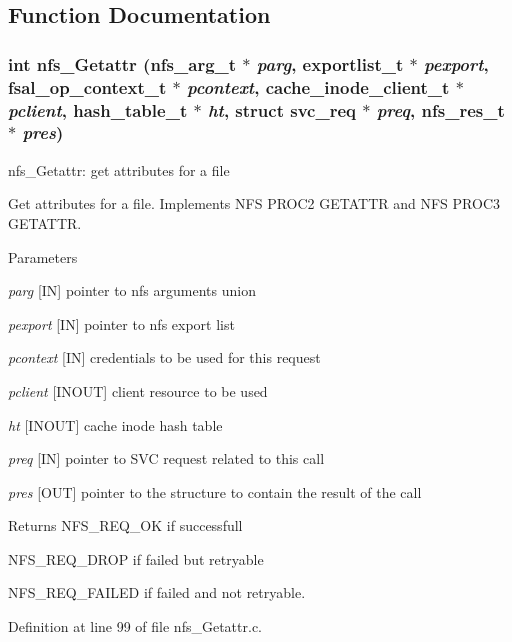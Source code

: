 \subsection{Function Documentation}
\subsubsection[{nfs\_\-Getattr}]{\setlength{\rightskip}{0pt plus 5cm}int nfs\_\-Getattr (nfs\_\-arg\_\-t $\ast$ {\em parg}, \/  exportlist\_\-t $\ast$ {\em pexport}, \/  fsal\_\-op\_\-context\_\-t $\ast$ {\em pcontext}, \/  cache\_\-inode\_\-client\_\-t $\ast$ {\em pclient}, \/  hash\_\-table\_\-t $\ast$ {\em ht}, \/  struct svc\_\-req $\ast$ {\em preq}, \/  nfs\_\-res\_\-t $\ast$ {\em pres})}\label{nfs__Getattr_8c_a17ae7823b8bce41be82ad3a08f9cb45c}
nfs\_\-Getattr: get attributes for a file

Get attributes for a file. Implements NFS PROC2 GETATTR and NFS PROC3 GETATTR.


\begin{DoxyParams}{Parameters}
\item[{\em parg}][IN] pointer to nfs arguments union \item[{\em pexport}][IN] pointer to nfs export list \item[{\em pcontext}][IN] credentials to be used for this request \item[{\em pclient}][INOUT] client resource to be used \item[{\em ht}][INOUT] cache inode hash table \item[{\em preq}][IN] pointer to SVC request related to this call \item[{\em pres}][OUT] pointer to the structure to contain the result of the call\end{DoxyParams}
\begin{DoxyReturn}{Returns}
NFS\_\-REQ\_\-OK if successfull \par
 NFS\_\-REQ\_\-DROP if failed but retryable \par
 NFS\_\-REQ\_\-FAILED if failed and not retryable. 
\end{DoxyReturn}


Definition at line 99 of file nfs\_\-Getattr.c.
